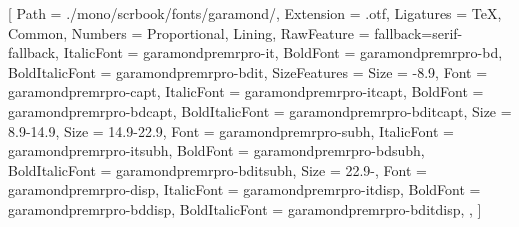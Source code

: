 \setmainfont{GaramondPremrProAlt}[
  Path               = ./mono/scrbook/fonts/garamond/,
  Extension          = .otf,
  Ligatures          = {TeX, Common},
  Numbers            = {Proportional, Lining},  %
  RawFeature         = {fallback=serif-fallback},
  ItalicFont         = garamondpremrpro-it,
  BoldFont           = garamondpremrpro-bd,
  BoldItalicFont     = garamondpremrpro-bdit,
  SizeFeatures = {
    {Size = -8.9,
     Font           = garamondpremrpro-capt,
     ItalicFont     = garamondpremrpro-itcapt,
     BoldFont       = garamondpremrpro-bdcapt,
     BoldItalicFont = garamondpremrpro-bditcapt},
    {Size = 8.9-14.9},  %
    {Size = 14.9-22.9,
     Font           = garamondpremrpro-subh,
     ItalicFont     = garamondpremrpro-itsubh,
     BoldFont       = garamondpremrpro-bdsubh,
     BoldItalicFont = garamondpremrpro-bditsubh},
    {Size = 22.9-,
     Font           = garamondpremrpro-disp,
     ItalicFont     = garamondpremrpro-itdisp,
     BoldFont       = garamondpremrpro-bddisp,
     BoldItalicFont = garamondpremrpro-bditdisp},
  },
]

